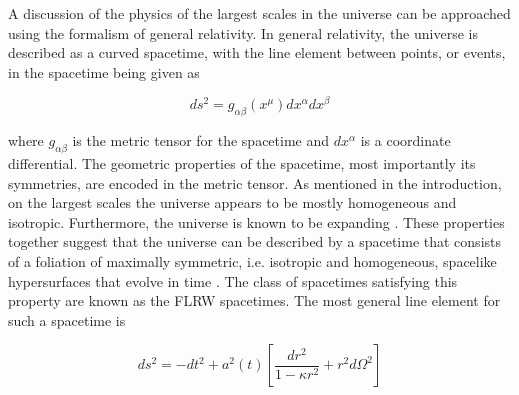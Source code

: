 \documentclass[10pt,letterpaper,final]{iopart}
\numberwithin{equation}{subsection}
\def\ni{\noindent}
\begin{document}
A discussion of the physics of the largest scales in the universe can be approached using the formalism of general relativity. In general relativity, the universe is described as a curved spacetime, with the line element between points, or events, in the spacetime being given as

\begin{equation}\label{eq:lineelement}
ds^2 = g_{\alpha \beta}(x^\mu)dx^\alpha dx^{\beta}
\end{equation}

\ni where $g_{\alpha\beta}$ is the metric tensor for the spacetime and $dx^\alpha$ is a coordinate differential. The geometric properties of the spacetime, most importantly its symmetries, are encoded in the metric tensor. As mentioned in the introduction, on the largest scales the universe appears to be mostly homogeneous and isotropic. Furthermore, the universe is known to be expanding \cite{Schneider}\cite{Dodelson}\cite{Carroll}\cite{Baumann}\cite{Hubble}. These properties together suggest that the universe can be described by a spacetime that consists of a foliation of maximally symmetric, i.e. isotropic and homogeneous, spacelike hypersurfaces that evolve in time \cite{Carroll}\cite{Dodelson}\cite{Baumann}.  The class of spacetimes satisfying this property are known as the FLRW spacetimes. The most general line element for such a spacetime is

\begin{equation}\label{eq:FLRWline}
ds^2 = -dt^2 + a^2(t)\left[\frac{dr^2}{1-\kappa r^2} + r^2d\Omega^2\right]
\end{equation}
\end{document}
